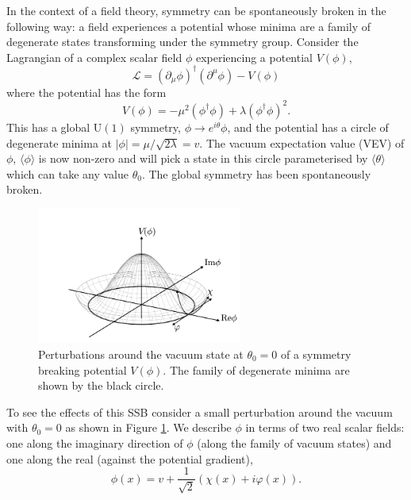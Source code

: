 In the context of a field theory, symmetry can be spontaneously broken in the following way: a field experiences a potential whose minima are a family of degenerate states transforming under the symmetry group. 
Consider the Lagrangian of a complex scalar field $\phi$ experiencing a potential $V(\phi)$,
\begin{equation}
    \label{eq:theory:global_SSB_L}
    \mathcal{L} = (\partial_{\mu}\phi)^{\dag}(\partial^{\mu}\phi) - V(\phi)
\end{equation}
where the potential has the form
\begin{equation}
    \label{eq:theory:global_u1_potential}
    V(\phi) = -\mu^{2}(\phi^{\dag}\phi) + \lambda(\phi^{\dag}\phi)^{2}.
\end{equation}
This has a global $\mathrm{U}(1)$ symmetry, $\phi\rightarrow{e^{i\theta}}\phi$, and the potential has a circle of degenerate minima at $|\phi| = {\mu}/{\sqrt{2\lambda}} = v$. 
The vacuum expectation value (VEV) of $\phi$, $\langle\phi\rangle$ is now non-zero and will pick a state in this circle parameterised by $\langle\theta\rangle$ which can take any value $\theta_{0}$. The global symmetry has been spontaneously broken.
\begin{figure}[h!]
    \centering
    \includegraphics[width=0.6\textwidth]{figures/theory/ssb_potential.pdf}
    \caption{Perturbations around the vacuum state at $\theta_0=0$ of a symmetry breaking potential $V(\phi)$. The family of degenerate minima are shown by the black circle.}
    \label{fig:theory:global_ssb_potential}
\end{figure}
To see the effects of this SSB consider a small perturbation around the vacuum with $\theta_{0}=0$ as shown in Figure \ref{fig:theory:global_ssb_potential}. 
We describe $\phi$ in terms of two real scalar fields: one along the imaginary direction of $\phi$ (along the family of vacuum states) and one along the real (against the potential gradient),
\begin{equation}
    \phi(x) = v + \frac{1}{\sqrt{2}}(\chi(x) + i\varphi(x)).
\end{equation}
